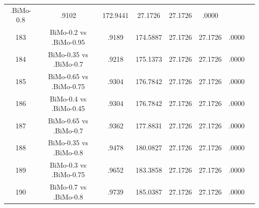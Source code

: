 \documentclass[a4paper,10pt]{article}
\begin{document}
\begin{landscape}
\begin{table}[!htp]
\begin{tabular}{cccccccc}
.BiMo-0.8&.9102&172.9441&27.1726&27.1726&.0000\\183&BiMo-0.2 vs .BiMo-0.95&.9189&174.5887&27.1726&27.1726&.0000\\184&BiMo-0.35 vs .BiMo-0.7&.9218&175.1373&27.1726&27.1726&.0000\\185&BiMo-0.65 vs .BiMo-0.75&.9304&176.7842&27.1726&27.1726&.0000\\186&BiMo-0.4 vs .BiMo-0.45&.9304&176.7842&27.1726&27.1726&.0000\\187&BiMo-0.65 vs .BiMo-0.7&.9362&177.8831&27.1726&27.1726&.0000\\188&BiMo-0.35 vs .BiMo-0.8&.9478&180.0827&27.1726&27.1726&.0000\\189&BiMo-0.3 vs .BiMo-0.75&.9652&183.3858&27.1726&27.1726&.0000\\190&BiMo-0.7 vs .BiMo-0.8&.9739&185.0387&27.1726&27.1726&.0000\\\hline
\end{tabular}
\end{table}

\end{landscape}
\end{document}
